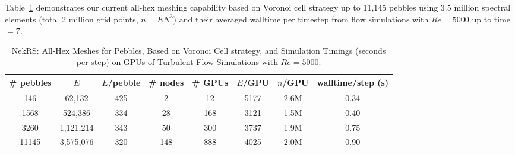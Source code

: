 Table~\ref{tab:pebble} demonstrates our current all-hex meshing capability based on Voronoi cell strategy
up to 11,145 pebbles using 3.5 million spectral elements (total 2 million grid points, $n = EN^3$) 
and their averaged walltime per timestep from flow simulations with
$Re= 5000$ up to time $=7$. %
\begin{table}
  \centering
  \begin{tabular}{cccccccc}
  \hline \hline
    \# pebbles & $E$ & $E$/pebble & \# nodes & \# GPUs & $E$/GPU & $n$/GPU & walltime/step (s) \\
  \hline
   146 & 62,132 & 425 & 2 & 12 & 5177 & 2.6M &  0.34    \\
   1568 & 524,386 & 334 & 28 & 168 & 3121 & 1.5M & 0.40   \\
   3260 & 1,121,214 & 343 & 50 & 300 & 3737 & 1.9M & 0.75   \\
   11145 & 3,575,076 & 320 & 148 & 888 & 4025 & 2.0M & 0.90  \\
    \hline \hline
  \end{tabular}
  \caption{NekRS: All-Hex Meshes for Pebbles, Based on Voronoi Cell strategy, and Simulation Timings (seconds per step) on GPUs
   of Turbulent Flow Simulations with $Re = 5000$.}
  \label{tab:pebble}
\end{table}

